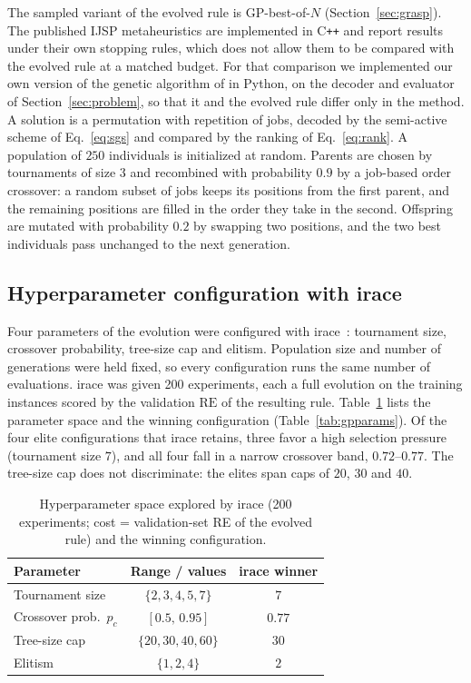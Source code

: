 \documentclass[preprint,number,sort&compress,12pt]{elsarticle}
\newcommand{\RE}{\mathrm{RE}}
\begin{document}
The sampled variant of the evolved rule is GP-best-of-$N$
(Section~\ref{sec:grasp}). The published IJSP metaheuristics are
implemented in C\texttt{++} and report results under their own stopping
rules, which does not allow them to be compared with the evolved rule at
a matched budget. For that comparison we implemented our own version of
the genetic algorithm of \citet{DiazGA2020} in Python, on the decoder
and evaluator of Section~\ref{sec:problem}, so that it and the evolved
rule differ only in the method. A solution is a permutation with
repetition of jobs, decoded by the semi-active scheme of
Eq.~\eqref{eq:sgs} and compared by the ranking of Eq.~\eqref{eq:rank}.
A population of $250$ individuals is initialized at random. Parents are
chosen by tournaments of size $3$ and recombined with probability $0.9$
by a job-based order crossover: a random subset of jobs keeps its
positions from the first parent, and the remaining positions are filled
in the order they take in the second. Offspring are mutated with
probability $0.2$ by swapping two positions, and the two best
individuals pass unchanged to the next generation.

\subsection{Hyperparameter configuration with irace}
\label{sec:irace}
Four parameters of the evolution were configured with
irace~\citep{LopezIbanez2016}: tournament size, crossover probability,
tree-size cap and elitism. Population size and number of generations
were held fixed, so every configuration runs the same number of
evaluations. irace was given 200 experiments, each a full evolution on
the training instances scored by the validation $\RE$ of the resulting
rule. Table~\ref{tab:irace} lists the parameter space and the winning
configuration (Table~\ref{tab:gpparams}). Of the four elite
configurations that irace retains, three favor a high selection
pressure (tournament size $7$), and all four fall in a narrow crossover
band, $0.72$--$0.77$. The tree-size cap does not discriminate: the
elites span caps of $20$, $30$ and $40$.

\begin{table}[t]
\centering\small
\caption{Hyperparameter space explored by irace (200 experiments; cost =
validation-set RE of the evolved rule) and the winning configuration.}
\label{tab:irace}
\begin{tabular}{lcc}
\toprule
Parameter & Range / values & irace winner \\
\midrule
Tournament size & $\{2, 3, 4, 5, 7\}$ & $7$ \\
Crossover prob.\ $p_c$ & $[0.5,\, 0.95]$ & $0.77$ \\
Tree-size cap & $\{20, 30, 40, 60\}$ & $30$ \\
Elitism & $\{1, 2, 4\}$ & $2$ \\
\bottomrule
\end{tabular}
\end{table}
\end{document}
